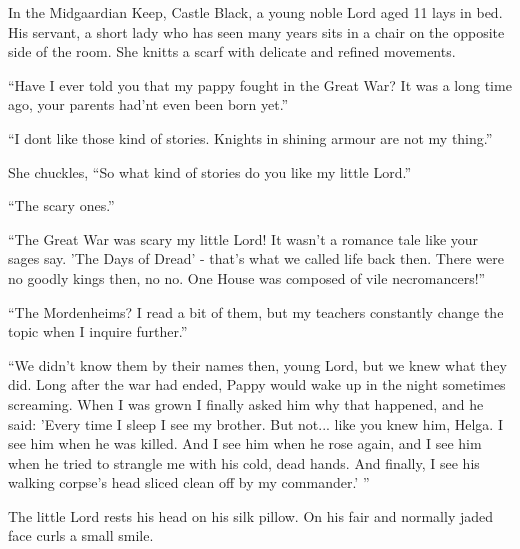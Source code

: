 \pagecolor{gray}\afterpage{\nopagecolor}
\selectfont
In the Midgaardian Keep, Castle Black, a young noble Lord aged 11 lays in bed. His servant, a short lady who has seen many years sits in a chair on the opposite side of the room. She knitts a scarf with delicate and refined movements. 

``Have I ever told you that my pappy fought in the Great War? It was a long time ago, your parents had'nt even been born yet.''

``I dont like those kind of stories. Knights in shining armour are not my thing.''

She chuckles, ``So what kind of stories do you like my little Lord.''

``The scary ones.''

``The Great War was scary my little Lord! It wasn't a romance tale like your sages say. 'The Days of Dread' - that's what we called life back then. There were no goodly kings then, no no. One House was composed of vile necromancers!''

``The Mordenheims? I read a bit of them, but my teachers constantly change the topic when I inquire further.''

``We didn't know them by their names then, young Lord, but we knew what they did. Long after the war had ended, Pappy would wake up in the night sometimes screaming. When I was grown I finally asked him why that happened, and he said: 'Every time I sleep I see my brother. But not... like you knew him, Helga. I see him when he was killed. And I see him when he rose again, and I see him when he tried to strangle me with his cold, dead hands. And finally, I see his walking corpse's head sliced clean off by my commander.' ''

The little Lord rests his head on his silk pillow. On his fair and normally jaded face curls a small smile. 

\normalfont